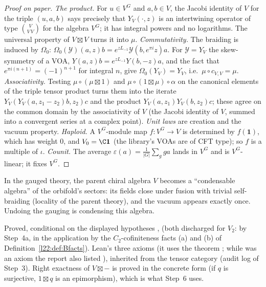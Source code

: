 \begin{proof}[Proof on paper]
\emph{The product.} For $u\in V^G$ and $a,b\in V$, the Jacobi identity of $V$ for the triple $(u,a,b)$ says precisely
that $Y_V(\cdot,z)$ is an intertwining operator of type $\binom{V}{V\,V}$ for the algebra $V^G$; it has integral powers
and no logarithms. The universal property of $V\boxtimes V$ turns it into $\mu$. \emph{Commutativity.} The braiding
is induced by $\Omega_0$: $\Omega_0(\mathcal Y)(a,z)b=e^{zL_{-1}}\mathcal Y(b,e^{\pi i}z)a$. For $\mathcal Y=Y_V$ the
skew-symmetry of a VOA, $Y(a,z)b=e^{zL_{-1}}Y(b,-z)a$, and the fact that $e^{\pi i(n+1)}=(-1)^{n+1}$ for integral $n$,
give $\Omega_0(Y_V)=Y_V$, i.e.\ $\mu\circ c_{V,V}=\mu$. \emph{Associativity.} Testing $\mu\circ(\mu\boxtimes1)$ and
$\mu\circ(1\boxtimes\mu)\circ\alpha$ on the canonical elements of the triple tensor product turns them into the
iterate $Y_V(Y_V(a,z_1-z_2)b,z_2)c$ and the product $Y_V(a,z_1)Y_V(b,z_2)c$; these agree on the common domain by the
associativity of $V$ (the Jacobi identity of $V$, summed into a convergent series at a complex point). \emph{Unit laws}
are creation and the vacuum property. \emph{Haploid.} A $V^G$-module map $f:V^G\to V$ is determined by $f(\mathbf 1)$,
which has weight $0$, and $V_0=\C\mathbf 1$ (the library's VOAs are of CFT type); so $f$ is a multiple of $\iota$.
\emph{Counit.} The average $\varepsilon(a)=\frac1{|G|}\sum_g g a$ lands in $V^G$ and is $V^G$-linear; it fixes $V^G$.
\end{proof}

\begin{physics}
In the gauged theory, the parent chiral algebra $V$ becomes a ``condensable algebra'' of the orbifold's sectors: its
fields close under fusion with trivial self-braiding (locality of the parent theory), and the vacuum appears exactly
once. Undoing the gauging is condensing this algebra.
\end{physics}

\begin{status}
Proved, conditional on the displayed hypotheses ,  (both discharged for $V_2$:  by Step~4a,
 in the application by the $C_2$-cofiniteness facts (a) and (b) of Definition~\ref{l22:def:Bfacts}). Lean's three axioms (it uses the theorem ; while  was an axiom the report also listed ), inherited from the tensor category (audit log of Step~3). Right exactness of $V\boxtimes-$ is proved in the concrete form  (if $q$ is
surjective, $1\boxtimes q$ is an epimorphism), which is what Step~6 uses.
\end{status}


